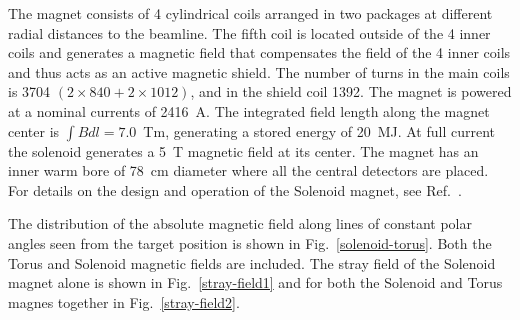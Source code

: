 \documentclass[final,3p,twocolumn]{elsarticle}
\begin{document}
The magnet consists of 4 cylindrical coils arranged in two packages at different radial distances to the beamline. The
fifth coil is located outside of the 4 inner coils and generates a magnetic field that compensates the field of the 4 inner
coils and thus acts as an active magnetic shield. The number of turns in the main coils is 3704
$(2 \times 840 + 2 \times 1012)$, and in the shield coil 1392. The magnet is powered at a nominal currents of 2416~A.
The integrated field length along the magnet center is $\int Bdl = 7.0$~Tm, generating a stored energy of 20~MJ. At
full current the solenoid generates a 5~T magnetic field at its center. The magnet has an inner warm bore of 78~cm
diameter where all the central detectors are placed.  For details on the design and operation of the Solenoid magnet,
see Ref.~\cite{clas12-magnets}.

The distribution of the absolute magnetic field along lines of constant polar angles seen from the target position is shown
in Fig.~\ref{solenoid-torus}. Both the Torus and Solenoid magnetic fields are included. The stray field of the Solenoid
magnet alone is shown in Fig.~\ref{stray-field1} and for both the Solenoid and Torus magnes together in
Fig.~\ref{stray-field2}.
 
\end{document}
